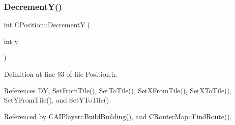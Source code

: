 \subsubsection{\texorpdfstring{Decrement\+Y()}{DecrementY()}}
{\footnotesize\ttfamily int C\+Position\+::\+DecrementY (\begin{DoxyParamCaption}\item[{int}]{y }\end{DoxyParamCaption})\hspace{0.3cm}{\ttfamily [inline]}}



Definition at line 93 of file Position.\+h.



References DY, Set\+From\+Tile(), Set\+To\+Tile(), Set\+X\+From\+Tile(), Set\+X\+To\+Tile(), Set\+Y\+From\+Tile(), and Set\+Y\+To\+Tile().



Referenced by C\+A\+I\+Player\+::\+Build\+Building(), and C\+Router\+Map\+::\+Find\+Route().


